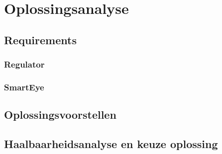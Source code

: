 \chapter{Oplossingsanalyse}
\section{Requirements}
\subsection{Regulator}

\subsection{SmartEye}

\section{Oplossingsvoorstellen}

\section{Haalbaarheidsanalyse en keuze oplossing}